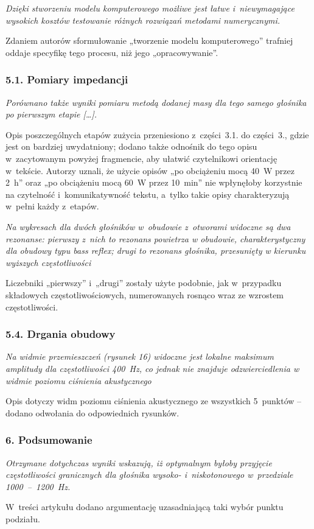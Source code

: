 \documentclass[12pt]{article}
\begin{document}
    \textit{Dzięki stworzeniu modelu komputerowego możliwe jest łatwe i~niewymagające wysokich kosztów testowanie różnych rozwiązań metodami numerycznymi.}
    
    Zdaniem autorów sformułowanie „tworzenie modelu komputerowego” trafniej oddaje specyfikę tego procesu, niż jego „opracowywanie”.
    
    \subsubsection*{5.1. Pomiary impedancji}
    
    \textit{Porównano także wyniki pomiaru metodą dodanej masy dla tego samego głośnika po pierwszym etapie [\dots].}
    
    Opis poszczególnych etapów zużycia przeniesiono z~części~3.1. do części~3., gdzie jest on bardziej uwydatniony; dodano także odnośnik do tego opisu w~zacytowanym powyżej fragmencie, aby ułatwić czytelnikowi orientację w~tekście. Autorzy uznali, że użycie opisów „po obciążeniu mocą \SI{40}{\watt} przez \SI{2}{\hour}” oraz „po obciążeniu mocą \SI{60}{\watt} przez \SI{10}{\minute}” nie wpłynęłoby korzystnie na czytelność i~komunikatywność tekstu, a~tylko takie opisy charakteryzują w~pełni każdy z~etapów.
    
    \textit{Na wykresach dla dwóch głośników w~obudowie z~otworami widoczne są dwa rezonanse: pierwszy z~nich to rezonans powietrza w obudowie, charakterystyczny dla obudowy typu \emph{bass reflex}; drugi to rezonans głośnika, przesunięty w kierunku wyższych częstotliwości}
    
    Liczebniki „pierwszy” i~„drugi” zostały użyte podobnie, jak w~przypadku składowych częstotliwościowych, numerowanych rosnąco wraz ze wzrostem częstotliwości.
    
    \subsubsection*{5.4. Drgania obudowy}
    
    \textit{Na widmie przemieszczeń (rysunek 16) widoczne jest lokalne maksimum amplitudy dla częstotliwości 400~Hz, co jednak nie znajduje odzwierciedlenia w widmie poziomu ciśnienia akustycznego}
    
    Opis dotyczy widm poziomu ciśnienia akustycznego ze wszystkich 5~punktów -- dodano odwołania do odpowiednich rysunków.
    
    \subsubsection*{6. Podsumowanie}
    
    \textit{Otrzymane dotychczas wyniki wskazują, iż optymalnym byłoby przyjęcie częstotliwości granicznych dla głośnika wysoko- i~niskotonowego w~przedziale \num{1000}~--~\SI{1200}{\hertz}.}
    
    W~treści artykułu dodano argumentację uzasadniającą taki wybór punktu podziału.
    
    
\end{document}
